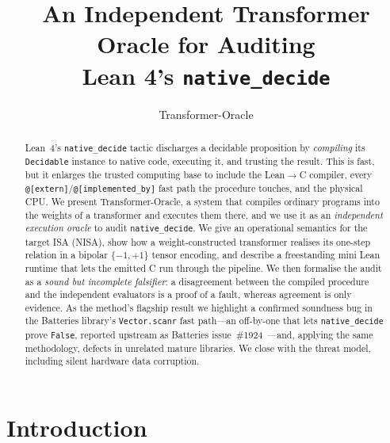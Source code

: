 \documentclass[11pt]{article}
\title{\bfseries An Independent Transformer Oracle for Auditing\\ Lean 4's \texttt{native\_decide}}
\author{Transformer-Oracle}
\date{}
\theoremstyle{definition}
\theoremstyle{plain}
\theoremstyle{remark}
\newcommand{\bp}{\{-1,+1\}}
\begin{document}
\maketitle

\begin{abstract}
Lean~4's \texttt{native\_decide} tactic discharges a decidable proposition by \emph{compiling} its
\texttt{Decidable} instance to native code, executing it, and trusting the result. This is fast, but
it enlarges the trusted computing base to include the Lean$\to$C compiler, every
\texttt{@[extern]}/\texttt{@[implemented\_by]} fast path the procedure touches, and the physical CPU.
We present Transformer-Oracle, a system that compiles ordinary programs into the weights of a transformer and
executes them there, and we use it as an \emph{independent execution oracle} to audit
\texttt{native\_decide}. We give an operational semantics for the target ISA (NISA), show how a
weight-constructed transformer realises its one-step relation in a bipolar $\bp$ tensor encoding, and
describe a freestanding mini Lean runtime that lets the emitted C run through the pipeline. We then
formalise the audit as a \emph{sound but incomplete falsifier}: a disagreement between the compiled
procedure and the independent evaluators is a proof of a fault, whereas agreement is only evidence.
As the method's flagship result we highlight a confirmed soundness bug in the Batteries library's
\texttt{Vector.scanr} fast path---an off-by-one that lets \texttt{native\_decide} prove
\texttt{False}, reported upstream as Batteries issue~\#1924~\cite{batteries1924}---and, applying the
same methodology, defects in unrelated mature libraries. We close with the threat model, including
silent hardware data corruption.
\end{abstract}

\section{Introduction}
\end{document}
